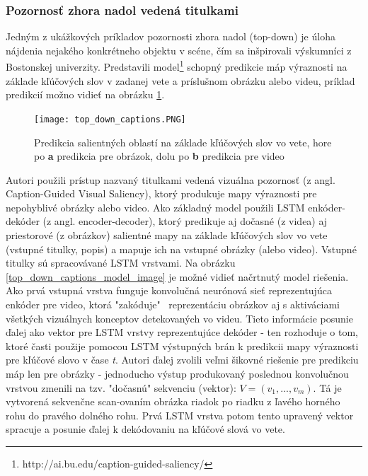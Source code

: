 \subsubsection{Pozornosť zhora nadol vedená titulkami}
\label{caption_model}
Jedným z ukážkových príkladov pozornosti zhora nadol (top-down) je úloha nájdenia nejakého konkrétneho objektu v scéne, čím sa inšpirovali výskumníci z Bostonskej univerzity. Predstavili model\footnote{http://ai.bu.edu/caption-guided-saliency/} \cite{ramanishka2017top} schopný predikcie máp výraznosti na základe kľúčových slov v zadanej vete a príslušnom obrázku alebo videu, príklad predikcií možno vidieť na obrázku \ref{top_down_captions_image}.

\begin{figure}[H]
	\begin{center}
		\texttt{[image: top\_down\_captions.PNG]}
		\caption[Predikcia salientných oblastí na základe kľúčových slov vo vete]{Predikcia salientných oblastí na základe kľúčových slov vo vete, hore po \textbf{a} predikcia pre obrázok, dolu po \textbf{b} predikcia pre video\cite{ramanishka2017top}\label{top_down_captions_image}}
	\end{center}
\end{figure}

Autori použili prístup nazvaný titulkami vedená vizuálna pozornosť (z angl. Caption-Guided Visual Saliency), ktorý produkuje mapy výraznosti pre nepohyblivé obrázky alebo video. Ako základný model použili LSTM enkóder-dekóder (z angl. encoder-decoder), ktorý predikuje aj dočasné (z videa) aj priestorové (z obrázkov) salientné mapy na základe kľúčových slov vo vete (vstupné titulky, popis) a mapuje ich na vstupné obrázky (alebo video). Vstupné titulky sú spracovávané LSTM vrstvami. Na obrázku \ref{top_down_captions_model_image} je možné vidieť načrtnutý model riešenia. Ako prvá vstupná vrstva funguje konvolučná neurónová sieť reprezentujúca enkóder pre video, ktorá "zakóduje" \ reprezentáciu obrázkov aj s aktiváciami všetkých vizuálnych konceptov detekovaných vo videu. Tieto informácie posunie ďalej ako vektor pre LSTM vrstvy reprezentujúce dekóder - ten rozhoduje o tom, ktoré časti použije pomocou LSTM výstupných brán k predikcii mapy výraznosti pre kľúčové slovo v čase \textit{t}. Autori ďalej zvolili veľmi šikovné riešenie pre predikciu máp len pre obrázky - jednoducho výstup produkovaný poslednou konvolučnou vrstvou zmenili na tzv. "dočasnú" sekvenciu (vektor): $V = (v_1, . . . , v_m)$. Tá je vytvorená sekvenčne scan-ovaním obrázka riadok po riadku z ľavého horného rohu do pravého dolného rohu. Prvá LSTM vrstva potom tento upravený vektor spracuje a posunie ďalej k dekódovaniu na kľúčové slová vo vete.

